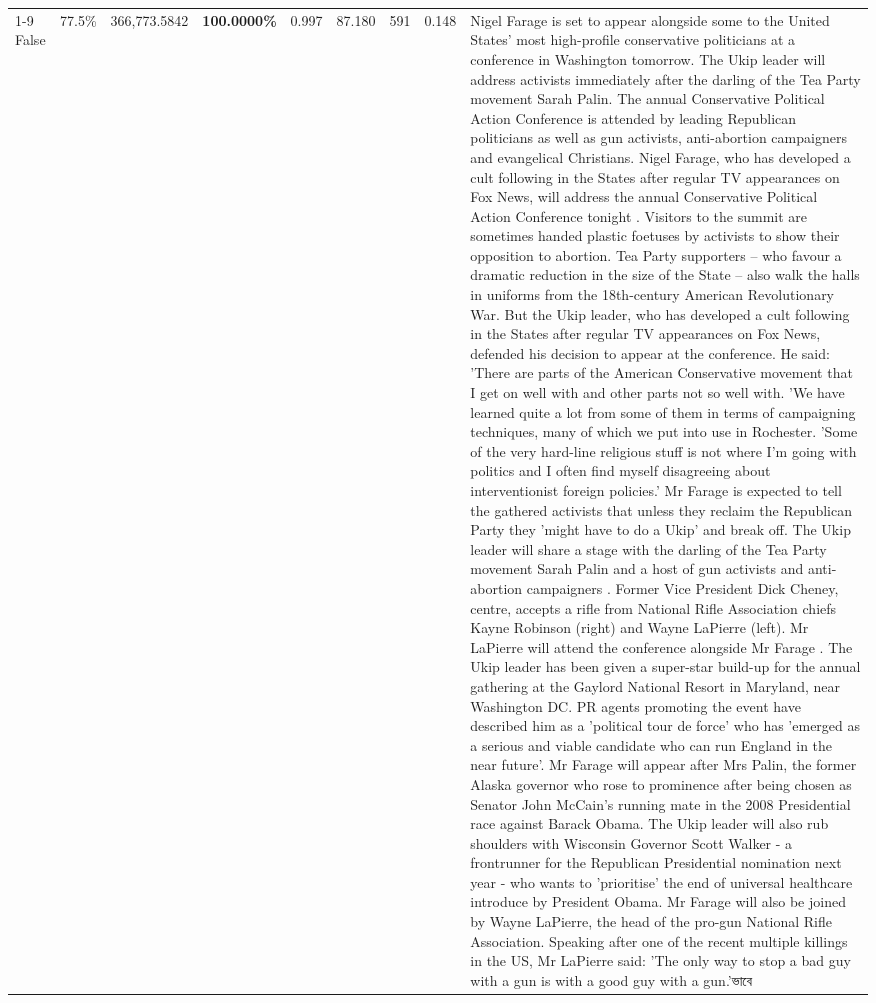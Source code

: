 \begin{table}[H]
\begin{tabular}{lllrlllll}
\cline{1-9} \cline{2-9}
False & 77.5\% & 366,773.5842 & \bfseries \color{red} 100.0000\% & 0.997 & 87.180 & 591 & 0.148 & Nigel Farage is set to appear alongside some to the United States' most high-profile conservative politicians at a conference in Washington tomorrow. The Ukip leader will address activists immediately after the darling of the Tea Party movement Sarah Palin. The annual Conservative Political Action Conference is attended by leading Republican politicians as well as gun activists, anti-abortion campaigners and evangelical Christians. Nigel Farage, who has developed a cult following in the States after regular TV appearances on Fox News, will address the annual Conservative Political Action Conference tonight . Visitors to the summit are sometimes handed plastic foetuses by activists to show their opposition to abortion. Tea Party supporters – who favour a dramatic reduction in the size of the State – also walk the halls in uniforms from the 18th-century American Revolutionary War. But the Ukip leader, who has developed a cult following in the States after regular TV appearances on Fox News, defended his decision to appear at the conference. He said: 'There are parts of the American Conservative movement that I get on well with and other parts not so well with. 'We have learned quite a lot from some of them in terms of campaigning techniques, many of which we put into use in Rochester. 'Some of the very hard-line religious stuff is not where I'm going with politics and I often find myself disagreeing about interventionist foreign policies.' Mr Farage is expected to tell the gathered activists that unless they reclaim the Republican Party they 'might have to do a Ukip' and break off. The Ukip leader will share a stage with the darling of the Tea Party movement Sarah Palin and a host of gun activists and anti-abortion campaigners . Former Vice President Dick Cheney, centre, accepts a rifle from National Rifle Association chiefs Kayne Robinson (right) and Wayne LaPierre (left). Mr LaPierre will attend the conference alongside Mr Farage . The Ukip leader has been given a super-star build-up for the annual gathering at the Gaylord National Resort in Maryland, near Washington DC. PR agents promoting the event have described him as a 'political tour de force' who has 'emerged as a serious and viable candidate who can run England in the near future'. Mr Farage will appear after Mrs Palin, the former Alaska governor who rose to prominence after being chosen as Senator John McCain's running mate in the 2008 Presidential race against Barack Obama. The Ukip leader will also rub shoulders with Wisconsin Governor Scott Walker - a frontrunner for the Republican Presidential nomination next year - who wants to 'prioritise' the end of universal healthcare introduce by President Obama. Mr Farage will also be joined by Wayne LaPierre, the head of the pro-gun National Rifle Association. Speaking after one of the recent multiple killings in the US, Mr LaPierre said: 'The only way to stop a bad guy with a gun is with a good guy with a gun.'ভাবে \\

\end{tabular}
\end{table}
